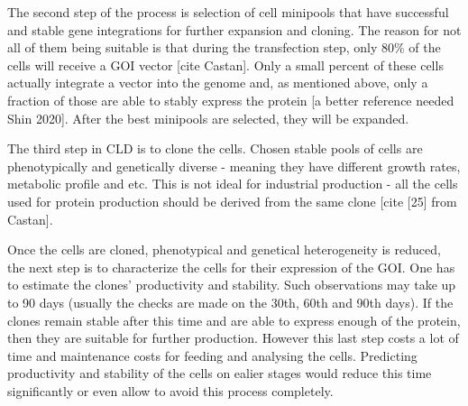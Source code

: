 The second step of the process is selection of cell minipools that have successful and stable gene integrations for further expansion and cloning. The reason for not all of them being suitable is that during the transfection step, only 80\% of the cells will receive a GOI vector [cite Castan]. Only a small percent of these cells actually integrate a vector into the genome and, as mentioned above, only a fraction of those are able to stably express the protein [a better reference needed Shin 2020]. After the best minipools are selected, they will be expanded.

The third step in CLD is to clone the cells. Chosen stable pools of cells are phenotypically and genetically diverse - meaning they have different growth rates, metabolic profile and etc. This is not ideal for industrial production - all the cells used for protein production should be derived from the same clone [cite [25] from Castan]. 

Once the cells are cloned, phenotypical and genetical heterogeneity is reduced, the next step is to characterize the cells for their expression of the GOI. One has to estimate the clones' productivity and stability. Such observations may take up to 90 days (usually the checks are made on the 30th, 60th and 90th days). If the clones remain stable after this time and are able to express enough of the protein, then they are suitable for further production. However this last step costs a lot of time and maintenance costs for feeding and analysing the cells. Predicting productivity and stability of the cells on ealier stages would reduce this time significantly or even allow to avoid this process completely. 